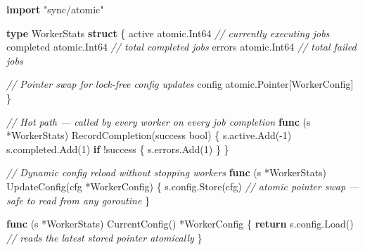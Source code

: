 \documentclass[
]{article}
\newenvironment{Shaded}{}{}
\newcommand{\CommentTok}[1]{\textcolor[rgb]{0.38,0.63,0.69}{\textit{#1}}}
\newcommand{\ControlFlowTok}[1]{\textcolor[rgb]{0.00,0.44,0.13}{\textbf{#1}}}
\newcommand{\DataTypeTok}[1]{\textcolor[rgb]{0.56,0.13,0.00}{#1}}
\newcommand{\DecValTok}[1]{\textcolor[rgb]{0.25,0.63,0.44}{#1}}
\newcommand{\KeywordTok}[1]{\textcolor[rgb]{0.00,0.44,0.13}{\textbf{#1}}}
\newcommand{\NormalTok}[1]{#1}
\newcommand{\OperatorTok}[1]{\textcolor[rgb]{0.40,0.40,0.40}{#1}}
\newcommand{\StringTok}[1]{\textcolor[rgb]{0.25,0.44,0.63}{#1}}
\begin{document}
\begin{Shaded}
\begin{Highlighting}[]
\KeywordTok{import} \StringTok{"sync/atomic"}

\KeywordTok{type}\NormalTok{ WorkerStats }\KeywordTok{struct} \OperatorTok{\{}
\NormalTok{    active    atomic}\OperatorTok{.}\NormalTok{Int64   }\CommentTok{// currently executing jobs}
\NormalTok{    completed atomic}\OperatorTok{.}\NormalTok{Int64   }\CommentTok{// total completed jobs}
\NormalTok{    errors    atomic}\OperatorTok{.}\NormalTok{Int64   }\CommentTok{// total failed jobs}

    \CommentTok{// Pointer swap for lock{-}free config updates}
\NormalTok{    config    atomic}\OperatorTok{.}\NormalTok{Pointer}\OperatorTok{[}\NormalTok{WorkerConfig}\OperatorTok{]}
\OperatorTok{\}}

\CommentTok{// Hot path — called by every worker on every job completion}
\KeywordTok{func} \OperatorTok{(}\NormalTok{s }\OperatorTok{*}\NormalTok{WorkerStats}\OperatorTok{)}\NormalTok{ RecordCompletion}\OperatorTok{(}\NormalTok{success }\DataTypeTok{bool}\OperatorTok{)} \OperatorTok{\{}
\NormalTok{    s}\OperatorTok{.}\NormalTok{active}\OperatorTok{.}\NormalTok{Add}\OperatorTok{({-}}\DecValTok{1}\OperatorTok{)}
\NormalTok{    s}\OperatorTok{.}\NormalTok{completed}\OperatorTok{.}\NormalTok{Add}\OperatorTok{(}\DecValTok{1}\OperatorTok{)}
    \ControlFlowTok{if} \OperatorTok{!}\NormalTok{success }\OperatorTok{\{}
\NormalTok{        s}\OperatorTok{.}\NormalTok{errors}\OperatorTok{.}\NormalTok{Add}\OperatorTok{(}\DecValTok{1}\OperatorTok{)}
    \OperatorTok{\}}
\OperatorTok{\}}

\CommentTok{// Dynamic config reload without stopping workers}
\KeywordTok{func} \OperatorTok{(}\NormalTok{s }\OperatorTok{*}\NormalTok{WorkerStats}\OperatorTok{)}\NormalTok{ UpdateConfig}\OperatorTok{(}\NormalTok{cfg }\OperatorTok{*}\NormalTok{WorkerConfig}\OperatorTok{)} \OperatorTok{\{}
\NormalTok{    s}\OperatorTok{.}\NormalTok{config}\OperatorTok{.}\NormalTok{Store}\OperatorTok{(}\NormalTok{cfg}\OperatorTok{)} \CommentTok{// atomic pointer swap — safe to read from any goroutine}
\OperatorTok{\}}

\KeywordTok{func} \OperatorTok{(}\NormalTok{s }\OperatorTok{*}\NormalTok{WorkerStats}\OperatorTok{)}\NormalTok{ CurrentConfig}\OperatorTok{()} \OperatorTok{*}\NormalTok{WorkerConfig }\OperatorTok{\{}
    \ControlFlowTok{return}\NormalTok{ s}\OperatorTok{.}\NormalTok{config}\OperatorTok{.}\NormalTok{Load}\OperatorTok{()} \CommentTok{// reads the latest stored pointer atomically}
\OperatorTok{\}}
\end{Highlighting}
\end{Shaded}
\end{document}
